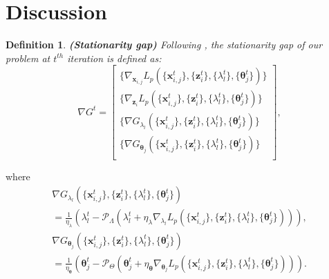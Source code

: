 \documentclass[letterpaper]{article} %
\newtheorem{definition}{Definition}
\begin{document}
\section{Discussion}
\begin{definition}
\label{definition:1}
{\textbf{(Stationarity gap)}} Following \cite{xu2020unified,lu2020hybrid,jiao2022distributed}, the \textit{stationarity} \textit{gap} of our problem at $t^{{th}}$ iteration is defined as:
\begin{equation}
\label{eq:definition1}
\nabla G^t = \left[ \begin{array}{l}
\{ {\nabla _{\boldsymbol{x}_{i,j}}}L_p(\{{\boldsymbol{x}_{i,j}^t}\} ,\!\{{\boldsymbol{z}_i^t} \},\! \{\lambda_l^t\}, \!\{\boldsymbol{\theta}_j^t\} )\}\\

\{ {\nabla _{\boldsymbol{z}_i}}L_p(\{{\boldsymbol{x}_{i,j}^t}\} ,\!\{{\boldsymbol{z}_i^t} \},\! \{\lambda_l^t\}, \!\{\boldsymbol{\theta}_j^t\} ) \} \\

\{  {\nabla G_{{\lambda_l}}}(\{{\boldsymbol{x}_{i,j}^t}\} ,\!\{{\boldsymbol{z}_i^t} \},\! \{\lambda_l^t\}, \!\{\boldsymbol{\theta}_j^t\} )   \} \\
\{{\nabla G_{{\boldsymbol{\theta}_j}}}(\{{\boldsymbol{x}_{i,j}^t}\} ,\!\{{\boldsymbol{z}_i^t} \},\! \{\lambda_l^t\}, \!\{\boldsymbol{\theta}_j^t\} )\} \\
\end{array} \right],
\end{equation}
\end{definition}
where
\begin{equation}
\begin{array}{l}
{\nabla G_{{\lambda_l}}}(\{{\boldsymbol{x}_{i,j}^t}\},\!\{{\boldsymbol{z}_i^t} \},\! \{\lambda_l^t\}, \!\{\boldsymbol{\theta}_j^t\} )

   \\ \!= \! \frac{1}{\eta_{\lambda}}\left(\lambda_l^t \!-\!\mathcal{P}_{\Lambda} (\lambda_l^t \!+\! \eta_{\lambda}{\nabla _{\lambda_l}}L_p(\{{\boldsymbol{x}_{i,j}^t}\} ,\!\{{\boldsymbol{z}_i^t} \},\! \{\lambda_l^t\}, \!\{\boldsymbol{\theta}_j^t\} ))\right) , \\%

{\nabla G_{{\boldsymbol{\theta}_j}}}(\{{\boldsymbol{x}_{i,j}^t}\},\!\{{\boldsymbol{z}_i^t} \},\! \{\lambda_l^t\}, \!\{\boldsymbol{\theta}_j^t\} )

   \\ \! = \! \frac{1}{\eta_{\boldsymbol{\theta}}}\left(\boldsymbol{\theta}_j^t \!- \! \mathcal{P}_{\Theta} (\boldsymbol{\theta}_j^t \!+\! \eta_{\boldsymbol{\theta}}{\nabla _{\boldsymbol{\theta}_j}}L_p(\{{\boldsymbol{x}_{i,j}^t}\} ,\!\{{\boldsymbol{z}_i^t} \},\! \{\lambda_l^t\}, \!\{\boldsymbol{\theta}_j^t\} ))\right) .
\end{array}
\end{equation}
\end{document}

